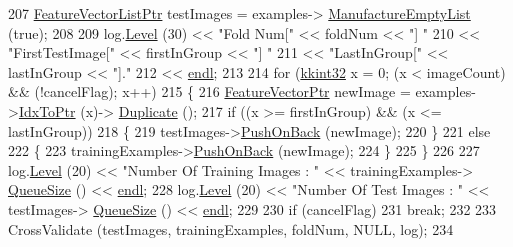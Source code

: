 \begin{DoxyCode}
207     \hyperlink{class_k_k_m_l_l_1_1_feature_vector_list}{FeatureVectorListPtr}  testImages       = examples->
      \hyperlink{class_k_k_m_l_l_1_1_feature_vector_list_af533da1b34e4123f4fcb1343d5f48e37}{ManufactureEmptyList} (\textcolor{keyword}{true});
208 
209     log.\hyperlink{class_k_k_b_1_1_run_log_a32cf761d7f2e747465fd80533fdbb659}{Level} (30) << \textcolor{stringliteral}{"Fold Num["}        << foldNum        << \textcolor{stringliteral}{"]   "}
210                    << \textcolor{stringliteral}{"FirstTestImage["}  << firstInGroup   << \textcolor{stringliteral}{"]   "}
211                    << \textcolor{stringliteral}{"LastInGroup["}     << lastInGroup    << \textcolor{stringliteral}{"]."}
212                    << \hyperlink{namespace_k_k_b_ad1f50f65af6adc8fa9e6f62d007818a8}{endl};
213 
214     \textcolor{keywordflow}{for}  (\hyperlink{namespace_k_k_b_a8fa4952cc84fda1de4bec1fbdd8d5b1b}{kkint32}  x = 0; (x < imageCount)  &&  (!cancelFlag); x++)
215     \{
216       \hyperlink{class_k_k_m_l_l_1_1_feature_vector}{FeatureVectorPtr}  newImage = examples->\hyperlink{class_k_k_b_1_1_k_k_queue_acce2bdd8b3327e38266cf198382cd852}{IdxToPtr} (x)->
      \hyperlink{class_k_k_m_l_l_1_1_feature_vector_a7be1e7f38a9d57f3be9bea904cf60be9}{Duplicate} ();
217       \textcolor{keywordflow}{if}  ((x >= firstInGroup)  &&  (x <= lastInGroup))
218       \{
219         testImages->\hyperlink{class_k_k_m_l_l_1_1_feature_vector_list_abd43779a90a6aa3db1de8092be877bdb}{PushOnBack} (newImage);
220       \}
221       \textcolor{keywordflow}{else}
222       \{
223         trainingExamples->\hyperlink{class_k_k_m_l_l_1_1_feature_vector_list_abd43779a90a6aa3db1de8092be877bdb}{PushOnBack} (newImage);
224       \}
225     \}
226 
227     log.\hyperlink{class_k_k_b_1_1_run_log_a32cf761d7f2e747465fd80533fdbb659}{Level} (20) << \textcolor{stringliteral}{"Number Of Training Images : "} << trainingExamples->
      \hyperlink{class_k_k_b_1_1_k_k_queue_a1dab601f75ee6a65d97f02bddf71c40d}{QueueSize} () << \hyperlink{namespace_k_k_b_ad1f50f65af6adc8fa9e6f62d007818a8}{endl};
228     log.\hyperlink{class_k_k_b_1_1_run_log_a32cf761d7f2e747465fd80533fdbb659}{Level} (20) << \textcolor{stringliteral}{"Number Of Test Images     : "} << testImages->
      \hyperlink{class_k_k_b_1_1_k_k_queue_a1dab601f75ee6a65d97f02bddf71c40d}{QueueSize} ()     << \hyperlink{namespace_k_k_b_ad1f50f65af6adc8fa9e6f62d007818a8}{endl};
229 
230     \textcolor{keywordflow}{if}  (cancelFlag)
231       \textcolor{keywordflow}{break};
232     
233     CrossValidate (testImages, trainingExamples, foldNum, NULL, log);
234 

\end{DoxyCode}
